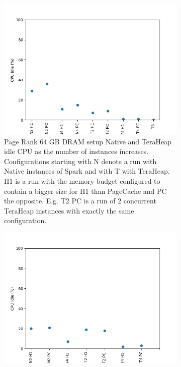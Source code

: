 \begin{figure}[htbp]
	\centering
	\begin{subfigure}[b]{0.48\textwidth}
        \includegraphics[width=\linewidth]{./fig/PR_64_IDLE.png}
    \caption{Page Rank 64 GB DRAM setup Native and TeraHeap idle CPU
    as the number of instances increases. Configurations starting with
    N denote a run with Native instances of Spark and with T with
    TeraHeap. H1 is a run with the memory budget configured to contain
    a bigger size for H1 than PageCache and PC the opposite. E.g. T2
    PC is a run of 2 concurrent TeraHeap instances with exactly the
    same configuration.}
	\label{fig:pr_64_idle}
\end{subfigure}
	\begin{subfigure}[b]{0.48\textwidth}
        \includegraphics[width=\linewidth]{./fig/LINR_64_IDLE.png}

\end{subfigure}
\end{figure}

